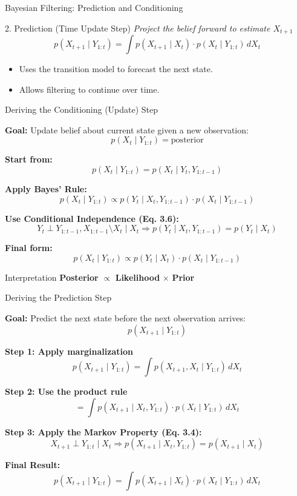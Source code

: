 \documentclass[handout,aspectratio=169]{beamer}
\begin{document}
\begin{frame}{Bayesian Filtering: Prediction and Conditioning}
\begin{block}{2. Prediction (Time Update Step)}
\textit{Project the belief forward to estimate \( X_{t+1} \)}
\[
p(X_{t+1} \mid Y_{1:t}) = \int p(X_{t+1} \mid X_t) \cdot p(X_t \mid Y_{1:t}) \, dX_t \tag{3.9}
\]
\begin{itemize}
  \item Uses the transition model to forecast the next state.
  \item Allows filtering to continue over time.
\end{itemize}
\end{block}

\end{frame}

\begin{frame}{Deriving the Conditioning (Update) Step}

\textbf{Goal:} Update belief about current state given a new observation:
\[
p(X_t \mid Y_{1:t}) = \text{posterior}
\]

\textbf{Start from:}
\[
p(X_t \mid Y_{1:t}) = p(X_t \mid Y_t, Y_{1:t-1})
\]

\textbf{Apply Bayes’ Rule:}
\[
p(X_t \mid Y_{1:t}) \propto p(Y_t \mid X_t, Y_{1:t-1}) \cdot p(X_t \mid Y_{1:t-1})
\]

\textbf{Use Conditional Independence (Eq. 3.6):}
\[
Y_t \perp Y_{1:t-1}, X_{1:t-1} \setminus X_t \mid X_t \Rightarrow p(Y_t \mid X_t, Y_{1:t-1}) = p(Y_t \mid X_t)
\]

\textbf{Final form:}
\[
p(X_t \mid Y_{1:t}) \propto p(Y_t \mid X_t) \cdot p(X_t \mid Y_{1:t-1}) \tag{3.8}
\]

\begin{block}{Interpretation}
\textbf{Posterior} \( \propto \) \textbf{Likelihood} \( \times \) \textbf{Prior}
\end{block}

\end{frame}

\begin{frame}{Deriving the Prediction Step}

\textbf{Goal:} Predict the next state before the next observation arrives:
\[
p(X_{t+1} \mid Y_{1:t})
\]

\textbf{Step 1: Apply marginalization}
\[
p(X_{t+1} \mid Y_{1:t}) = \int p(X_{t+1}, X_t \mid Y_{1:t}) \, dX_t
\]

\textbf{Step 2: Use the product rule}
\[
= \int p(X_{t+1} \mid X_t, Y_{1:t}) \cdot p(X_t \mid Y_{1:t}) \, dX_t
\]

\textbf{Step 3: Apply the Markov Property (Eq. 3.4):}
\[
X_{t+1} \perp Y_{1:t} \mid X_t \Rightarrow p(X_{t+1} \mid X_t, Y_{1:t}) = p(X_{t+1} \mid X_t)
\]

\textbf{Final Result:}
\[
p(X_{t+1} \mid Y_{1:t}) = \int p(X_{t+1} \mid X_t) \cdot p(X_t \mid Y_{1:t}) \, dX_t \tag{3.9}
\]

\end{frame}
\end{document}

